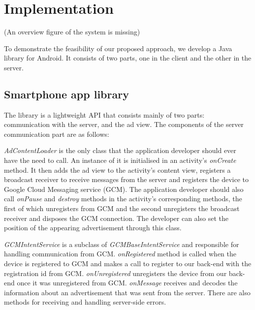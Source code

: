 
\chapter{Implementation} %





\ifpdf
    \graphicspath{{X/figures/PNG/}{X/figures/PDF/}{X/figures/}}
\else
    \graphicspath{{X/figures/EPS/}{X/figures/}}
\fi

(An overview figure of the system is missing)


To demonstrate the feasibility of our proposed approach, we develop a Java library for Android. It consists of two parts, one in the client and the other in the server.


\section{Smartphone app library}

The library is a lightweight API that consists mainly of two parts: communication with the server,  and the ad view. The components of the server communication part are as follows:

\textit{AdContentLoader} is the only class that the application developer should ever have the need to call. An instance of it is initialised in an activity's \textit{onCreate} method. It then adds the ad view to the activity's content view, registers a broadcast receiver to receive messages from the server and registers the device to Google Cloud Messaging service (GCM).\cite{notifications:gcm} The application developer should also call \textit{onPause} and \textit{destroy} methods in the activity's corresponding methods, the first of which unregisters from GCM and the second unregisters the broadcast receiver and disposes the GCM connection. The developer can also set the position of the appearing advertisement through this class.

\textit{GCMIntentService} is a subclass of \textit{GCMBaseIntentService} and responsible for handling communication from GCM. \textit{onRegistered} method is called when the device is registered to GCM and makes a call to register to our back-end with the registration id from GCM. \textit{onUnregistered} unregisters the device from our back-end once it was unregistered from GCM. \textit{onMessage} receives and decodes the information about an advertisement that was sent from the server. There are also methods for receiving and handling server-side errors.

